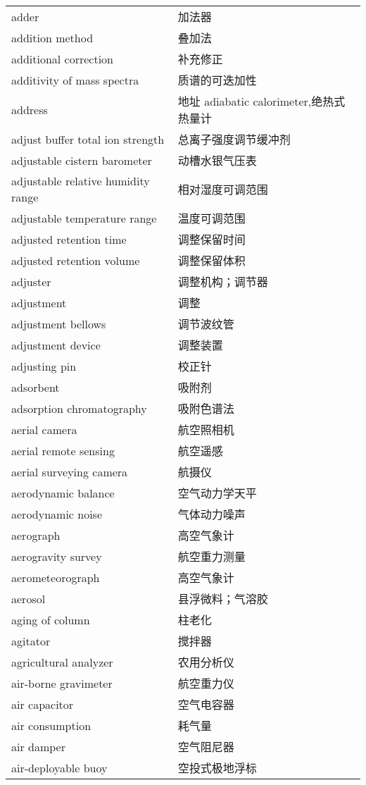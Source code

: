 \documentclass[
]{article}
\begin{document}
\begin{longtable}[]{@{}ll@{}}
adder & 加法器 \\
addition method & 叠加法 \\
additional correction & 补充修正 \\
additivity of mass spectra & 质谱的可迭加性 \\
address & 地址 adiabatic calorimeter,绝热式热量计 \\
adjust buffer total ion strength & 总离子强度调节缓冲剂 \\
adjustable cistern barometer & 动槽水银气压表 \\
adjustable relative humidity range & 相对湿度可调范围 \\
adjustable temperature range & 温度可调范围 \\
adjusted retention time & 调整保留时间 \\
adjusted retention volume & 调整保留体积 \\
adjuster & 调整机构；调节器 \\
adjustment & 调整 \\
adjustment bellows & 调节波纹管 \\
adjustment device & 调整装置 \\
adjusting pin & 校正针 \\
adsorbent & 吸附剂 \\
adsorption chromatography & 吸附色谱法 \\
aerial camera & 航空照相机 \\
aerial remote sensing & 航空遥感 \\
aerial surveying camera & 航摄仪 \\
aerodynamic balance & 空气动力学天平 \\
aerodynamic noise & 气体动力噪声 \\
aerograph & 高空气象计 \\
aerogravity survey & 航空重力测量 \\
aerometeorograph & 高空气象计 \\
aerosol & 县浮微料；气溶胶 \\
aging of column & 柱老化 \\
agitator & 搅拌器 \\
agricultural analyzer & 农用分析仪 \\
air-borne gravimeter & 航空重力仪 \\
air capacitor & 空气电容器 \\
air consumption & 耗气量 \\
air damper & 空气阻尼器 \\
air-deployable buoy & 空投式极地浮标 \\

\end{longtable}
\end{document}

